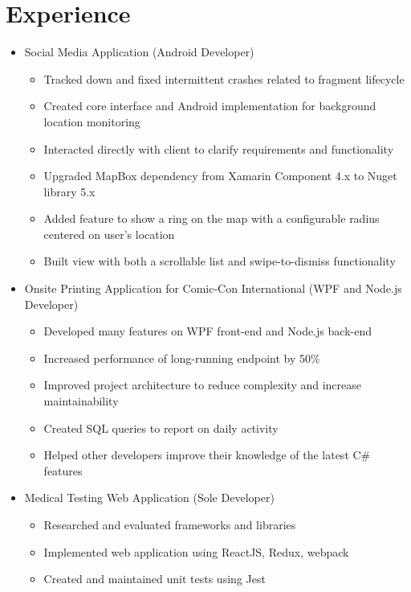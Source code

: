 \documentclass[12pt,letterpaper,sans]{moderncv}
\begin{document}
\section{Experience}
    \begin{itemize}[leftmargin=1.24in]
    	\item Social Media Application (Android Developer)
    		\begin{itemize}
    			\item Tracked down and fixed intermittent crashes related to fragment lifecycle
    			\item Created core interface and Android implementation for background location monitoring
    			\item Interacted directly with client to clarify requirements and functionality
    			\item Upgraded MapBox dependency from Xamarin Component 4.x to Nuget library 5.x
    			\item Added feature to show a ring on the map with a configurable radius centered on user's location
    			\item Built view with both a scrollable list and swipe-to-dismiss functionality
    		\end{itemize}
    	\item Onsite Printing Application for Comic-Con International (WPF and Node.js Developer)
    		\begin{itemize}
    			\item Developed many features on WPF front-end and Node.js back-end
    			\item Increased performance of long-running endpoint by 50\%
    			\item Improved project architecture to reduce complexity and increase maintainability
    			\item Created SQL queries to report on daily activity
    			\item Helped other developers improve their knowledge of the latest C\# features
   			\end{itemize}
    	\item Medical Testing Web Application (Sole Developer)
	    	\begin{itemize}
	    		\item Researched and evaluated frameworks and libraries
	    		\item Implemented web application using ReactJS, Redux, webpack
	    		\item Created and maintained unit tests using Jest

\end{itemize}
\end{itemize}
\end{document}
